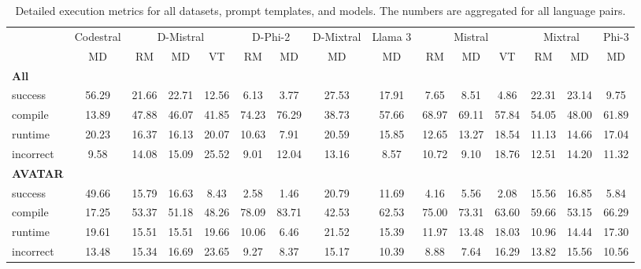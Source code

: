 \begin{table}[t]
\caption{Detailed execution metrics for all datasets, prompt templates, and models. The numbers are aggregated for all language pairs.}
\label{tab:iteration_1_stats_percent_total}

\setlength{\tabcolsep}{2.5pt} %
\renewcommand{\arraystretch}{1} %

\footnotesize
\begin{tabular}{@{}lcccccccccccccc@{}}
\toprule
 & Codestral & \multicolumn{3}{c}{D-Mistral} & \multicolumn{2}{c}{D-Phi-2} & D-Mixtral & Llama 3 & \multicolumn{3}{c}{Mistral}  & \multicolumn{2}{c}{Mixtral} & Phi-3 \\ 

\cmidrule(l){2-2}
\cmidrule(l){3-5}
\cmidrule(l){6-7}
\cmidrule(l){8-8}
\cmidrule(l){9-9}
\cmidrule(l){10-12}
\cmidrule(l){13-14}
\cmidrule(l){15-15}

& \multicolumn{1}{c}{MD}
& \multicolumn{1}{c}{RM}
& \multicolumn{1}{c}{MD}
& \multicolumn{1}{c}{VT}
& \multicolumn{1}{c}{RM}
& \multicolumn{1}{c}{MD} 
& \multicolumn{1}{c}{MD} 
& \multicolumn{1}{c}{MD} 
& \multicolumn{1}{c}{RM} 
& \multicolumn{1}{c}{MD} 
& \multicolumn{1}{c}{VT} 
& \multicolumn{1}{c}{RM}
& \multicolumn{1}{c}{MD} 
& \multicolumn{1}{c}{MD} \\

\midrule
\textbf{All} & & & & & & & & & & & & & & \\ 
\quad success & 56.29 & 21.66 & 22.71 & 12.56 & 6.13 & 3.77 & 27.53 & 17.91 & 7.65 & 8.51 & 4.86 & 22.31 & 23.14 & 9.75 \\
\qquad compile & 13.89 & 47.88 & 46.07 & 41.85 & 74.23 & 76.29 & 38.73 & 57.66 & 68.97 & 69.11 & 57.84 & 54.05 & 48.00 & 61.89 \\
\qquad runtime & 20.23 & 16.37 & 16.13 & 20.07 & 10.63 & 7.91 & 20.59 & 15.85 & 12.65 & 13.27 & 18.54 & 11.13 & 14.66 & 17.04 \\
\qquad incorrect & 9.58 & 14.08 & 15.09 & 25.52 & 9.01 & 12.04 & 13.16 & 8.57 & 10.72 & 9.10 & 18.76 & 12.51 & 14.20 & 11.32 \\
 

\textbf{AVATAR} & & & & & & & & & & & & & & \\
\quad success & 49.66 & 15.79 & 16.63 & 8.43 & 2.58 & 1.46 & 20.79 & 11.69 & 4.16 & 5.56 & 2.08 & 15.56 & 16.85 & 5.84 \\
\qquad compile & 17.25 & 53.37 & 51.18 & 48.26 & 78.09 & 83.71 & 42.53 & 62.53 & 75.00 & 73.31 & 63.60 & 59.66 & 53.15 & 66.29 \\
\qquad runtime & 19.61 & 15.51 & 15.51 & 19.66 & 10.06 & 6.46 & 21.52 & 15.39 & 11.97 & 13.48 & 18.03 & 10.96 & 14.44 & 17.30 \\
\qquad incorrect & 13.48 & 15.34 & 16.69 & 23.65 & 9.27 & 8.37 & 15.17 & 10.39 & 8.88 & 7.64 & 16.29 & 13.82 & 15.56 & 10.56 \\
 


\end{tabular}
\end{table}
